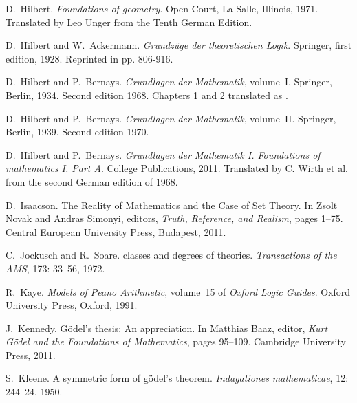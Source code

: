 \documentclass[11pt,fleqn,leqno]{article}
\begin{document}
\begin{thebibliography}{118}
D.~Hilbert.
\newblock \emph{Foundations of geometry}.
\newblock Open Court, La Salle, Illinois, 1971.
\newblock Translated by Leo Unger from the Tenth German Edition.

D.~Hilbert and W.~Ackermann.
\newblock \emph{Grundz{\"u}ge der theoretischen Logik}.
\newblock Springer, first edition, 1928.
\newblock Reprinted in \cite{Hilbert2013} pp. 806-916.

D.~Hilbert and P.~Bernays.
\newblock \emph{{Grundlagen der Mathematik}}, volume~I.
\newblock Springer, Berlin, 1934.
\newblock Second edition 1968. Chapters 1 and 2 translated as
  \citep{HIlbert2011}.

D.~Hilbert and P.~Bernays.
\newblock \emph{{Grundlagen der Mathematik}}, volume~II.
\newblock Springer, Berlin, 1939.
\newblock Second edition 1970.

D.~Hilbert and P.~Bernays.
\newblock \emph{{Grundlagen der Mathematik I. Foundations of mathematics I.
  Part A}}.
\newblock College Publications, 2011.
\newblock Translated by C. Wirth et al. from the second German edition of 1968.

D.~Isaacson.
\newblock The {R}eality of {M}athematics and the {C}ase of {S}et {T}heory.
\newblock In Zsolt Novak and Andras Simonyi, editors, \emph{Truth, Reference,
  and Realism}, pages 1--75. Central European University Press, Budapest, 2011.

C.~Jockusch and R.~Soare.
 classes and degrees of theories.
\newblock \emph{Transactions of the AMS}, 173: 33--56, 1972.

R.~Kaye.
\newblock \emph{Models of {P}eano {A}rithmetic}, volume~15 of \emph{Oxford
  Logic Guides}.
\newblock Oxford University Press, Oxford, 1991.

J.~Kennedy.
\newblock G\"odel's thesis: An appreciation.
\newblock In Matthias Baaz, editor, \emph{Kurt G{\"o}del and the Foundations of
  Mathematics}, pages 95--109. Cambridge University Press, 2011.

S.~Kleene.
\newblock A symmetric form of g{\"o}del's theorem.
\newblock \emph{Indagationes mathematicae}, 12: 244--24, 1950.


\end{thebibliography}
\end{document}
